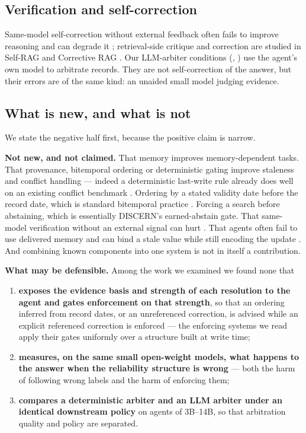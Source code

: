 \subsection{Verification and self-correction}

Same-model self-correction without external feedback often fails to improve reasoning and can degrade it
\citep{huang2023selfcorrect,kamoi2024survey}; retrieval-side critique and correction are studied in Self-RAG and
Corrective RAG \citep{asai2023selfrag,yan2024crag}. Our LLM-arbiter conditions (, ) use the
agent's own model to arbitrate records. They are not self-correction of the answer, but their errors are of the same
kind: an unaided small model judging evidence.

\subsection{What is new, and what is not}
\label{sec:novelty}

We state the negative half first, because the positive claim is narrow.

\textbf{Not new, and not claimed.} That memory improves memory-dependent tasks. That provenance, bitemporal
ordering or deterministic gating improve staleness and conflict handling
\citep{ahuja2026discern,wang2026pacmi,xu2026gpm,wang2026toki} --- indeed a deterministic last-write rule already
does well on an existing conflict benchmark \citep{pakhomov2026bookkeeping}. Ordering by a stated validity date
before the record date, which is standard bitemporal practice \citep{jensen1999temporal}. Forcing a search before
abstaining, which is essentially DISCERN's earned-abstain gate. That same-model verification without an external
signal can hurt \citep{huang2023selfcorrect,kamoi2024survey}. That agents often fail to use delivered memory and can
bind a stale value while still encoding the update \citep{xu2026delivered,guo2026cicm}. And combining known
components into one system is not in itself a contribution.

\textbf{What may be defensible.} Among the work we examined we found none that

\begin{enumerate}[leftmargin=1.6em,itemsep=1pt,topsep=2pt]
\item \textbf{exposes the evidence basis and strength of each resolution to the agent and gates enforcement on that
strength}, so that an ordering inferred from record dates, or an unreferenced correction, is advised while an
explicit referenced correction is enforced --- the enforcing systems we read apply their gates uniformly over a
structure built at write time;
\item \textbf{measures, on the same small open-weight models, what happens to the answer when the reliability
structure is wrong} --- both the harm of following wrong labels and the harm of enforcing them;
\item \textbf{compares a deterministic arbiter and an LLM arbiter under an identical downstream policy} on agents of
3B--14B, so that arbitration quality and policy are separated.
\end{enumerate}

